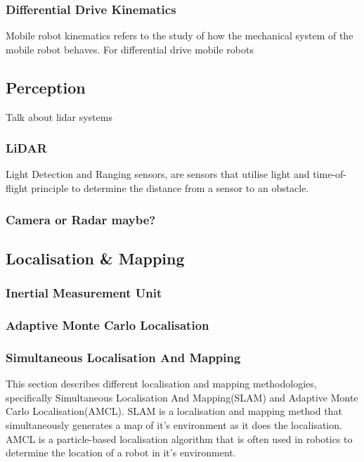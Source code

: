 \subsubsection{Differential Drive Kinematics}
Mobile robot kinematics refers to the study of how the mechanical system of the mobile robot behaves. For differential drive mobile robots 

\subsection{Perception}
Talk about lidar systems
\subsubsection{LiDAR}
Light Detection and Ranging sensors, are sensors that utilise light and time-of-flight principle to determine the distance from a sensor to an obstacle. 

\subsubsection{Camera or Radar maybe?}


\subsection{Localisation \& Mapping}


\subsubsection{Inertial Measurement Unit}


\subsubsection{Adaptive Monte Carlo Localisation}


\subsubsection{Simultaneous Localisation And Mapping}
This section describes different localisation and mapping methodologies, specifically Simultaneous Localisation And Mapping(SLAM) and Adaptive Monte Carlo Localisation(AMCL). SLAM is a localisation and mapping method that simultaneously generates a map of it's environment as it does the localisation. AMCL is a particle-based localisation algorithm that is often used in robotics to determine the location of a robot in it's environment.

